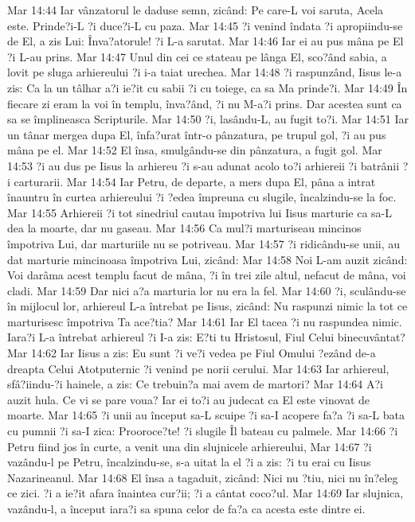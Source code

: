 Mar 14:44  Iar vânzatorul le daduse semn, zicând: Pe care-L voi saruta, Acela este. Prinde?i-L ?i duce?i-L cu paza.
Mar 14:45  ?i venind îndata ?i apropiindu-se de El, a zis Lui: Înva?atorule! ?i L-a sarutat.
Mar 14:46  Iar ei au pus mâna pe El ?i L-au prins.
Mar 14:47  Unul din cei ce stateau pe lânga El, sco?ând sabia, a lovit pe sluga arhiereului ?i i-a taiat urechea.
Mar 14:48  ?i raspunzând, Iisus le-a zis: Ca la un tâlhar a?i ie?it cu sabii ?i cu toiege, ca sa Ma prinde?i.
Mar 14:49  În fiecare zi eram la voi în templu, înva?ând, ?i nu M-a?i prins. Dar acestea sunt ca sa se împlineasca Scripturile.
Mar 14:50  ?i, lasându-L, au fugit to?i.
Mar 14:51  Iar un tânar mergea dupa El, înfa?urat într-o pânzatura, pe trupul gol, ?i au pus mâna pe el.
Mar 14:52  El însa, smulgându-se din pânzatura, a fugit gol.
Mar 14:53  ?i au dus pe Iisus la arhiereu ?i s-au adunat acolo to?i arhiereii ?i batrânii ?i carturarii.
Mar 14:54  Iar Petru, de departe, a mers dupa El, pâna a intrat înauntru în curtea arhiereului ?i ?edea împreuna cu slugile, încalzindu-se la foc.
Mar 14:55  Arhiereii ?i tot sinedriul cautau împotriva lui Iisus marturie ca sa-L dea la moarte, dar nu gaseau.
Mar 14:56  Ca mul?i marturiseau mincinos împotriva Lui, dar marturiile nu se potriveau.
Mar 14:57  ?i ridicându-se unii, au dat marturie mincinoasa împotriva Lui, zicând:
Mar 14:58  Noi L-am auzit zicând: Voi darâma acest templu facut de mâna, ?i în trei zile altul, nefacut de mâna, voi cladi.
Mar 14:59  Dar nici a?a marturia lor nu era la fel.
Mar 14:60  ?i, sculându-se în mijlocul lor, arhiereul L-a întrebat pe Iisus, zicând: Nu raspunzi nimic la tot ce marturisesc împotriva Ta ace?tia?
Mar 14:61  Iar El tacea ?i nu raspundea nimic. Iara?i L-a întrebat arhiereul ?i I-a zis: E?ti tu Hristosul, Fiul Celui binecuvântat?
Mar 14:62  Iar Iisus a zis: Eu sunt ?i ve?i vedea pe Fiul Omului ?ezând de-a dreapta Celui Atotputernic ?i venind pe norii cerului.
Mar 14:63  Iar arhiereul, sfâ?iindu-?i hainele, a zis: Ce trebuin?a mai avem de martori?
Mar 14:64  A?i auzit hula. Ce vi se pare voua? Iar ei to?i au judecat ca El este vinovat de moarte.
Mar 14:65  ?i unii au început sa-L scuipe ?i sa-I acopere fa?a ?i sa-L bata cu pumnii ?i sa-I zica: Prooroce?te! ?i slugile Îl bateau cu palmele.
Mar 14:66  ?i Petru fiind jos în curte, a venit una din slujnicele arhiereului,
Mar 14:67  ?i vazându-l pe Petru, încalzindu-se, s-a uitat la el ?i a zis: ?i tu erai cu Iisus Nazarineanul.
Mar 14:68  El însa a tagaduit, zicând: Nici nu ?tiu, nici nu în?eleg ce zici. ?i a ie?it afara înaintea cur?ii; ?i a cântat coco?ul.
Mar 14:69  Iar slujnica, vazându-l, a început iara?i sa spuna celor de fa?a ca acesta este dintre ei.

